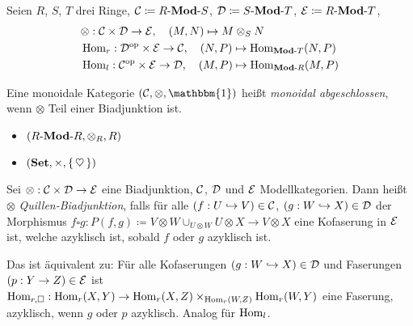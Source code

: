 \documentclass{cheat-sheet}
\newcommand{\LonelyHeart}{\{ \, \heartsuit \, \}} %
\newcommand{\UnitOb}{\mathbbm{1}} %
\begin{document}
\begin{bsp}
  Seien $R$, $S$, $T$ drei Ringe, $\mathcal{C} \coloneqq {R}\text{-}\mathbf{Mod}\text{-}{S}$, $\mathcal{D} \coloneqq {S}\text{-}\mathbf{Mod}\text{-}{T}$, $\mathcal{E} \coloneqq {R}\text{-}\mathbf{Mod}\text{-}{T}$,
  \begin{align*}
    & \otimes : \mathcal{C} \times \mathcal{D} \to \mathcal{E}, \quad (M, N) \mapsto M \otimes_S N \\
    & \operatorname{Hom}_r : \mathcal{D}^{\mathrm{op}} \times \mathcal{E} \to \mathcal{C}, \quad (N, P) \mapsto \operatorname{Hom}_{\mathbf{Mod}\text{-}{T}}(N, P) \\
    & \operatorname{Hom}_l : \mathcal{C}^{\mathrm{op}} \times \mathcal{E} \to \mathcal{D}, \quad (M, P) \mapsto \operatorname{Hom}_{\mathbf{Mod}\text{-}{R}}(M, P)
  \end{align*}
\end{bsp}

\begin{defn}
  Eine monoidale Kategorie $(\Cat, \otimes, \UnitOb)$ heißt \emph{monoidal abgeschlossen}, wenn $\otimes$ Teil einer Biadjunktion ist.
\end{defn}

\begin{bspe}
  \begin{itemize}
    \item $({R}\text{-}\mathbf{Mod}\text{-}{R}, \otimes_R, R)$
    \item $(\SetC, \times, \LonelyHeart)$
  \end{itemize}
\end{bspe}


\begin{defn}
  Sei $\otimes : \mathcal{C} \times \mathcal{D} \to \mathcal{E}$ eine Biadjunktion, $\mathcal{C}$, $\mathcal{D}$ und $\mathcal{E}$ Modellkategorien.
  Dann heißt $\otimes$ \emph{Quillen-Biadjunktion}, falls für alle $(f : U \hookrightarrow V) \in \mathcal{C}$, $(g : W \hookrightarrow X) \in \mathcal{D}$ der Morphismus $f \square g : P(f, g) \coloneqq V \otimes W \cup_{U \otimes W} U \otimes X \to V \otimes X$ eine Kofaserung in $\mathcal{E}$ ist, welche azyklisch ist, sobald $f$ oder $g$ azyklisch ist.
\end{defn}

\begin{bem}
  Das ist äquivalent zu:
  Für alle Kofaserungen $(g : W \hookrightarrow X) \in \mathcal{D}$ und Faserungen $(p : Y \to Z) \in \mathcal{E}$ ist $\operatorname{Hom}_{r,\square} : \operatorname{Hom}_r(X, Y) \to \operatorname{Hom}_r(X, Z) \times_{\operatorname{Hom}_r(W, Z)} \operatorname{Hom}_r(W, Y)$ eine Faserung, azyklisch, wenn $g$ oder $p$ azyklisch. Analog für $\operatorname{Hom}_l$.
\end{bem}
\end{document}
